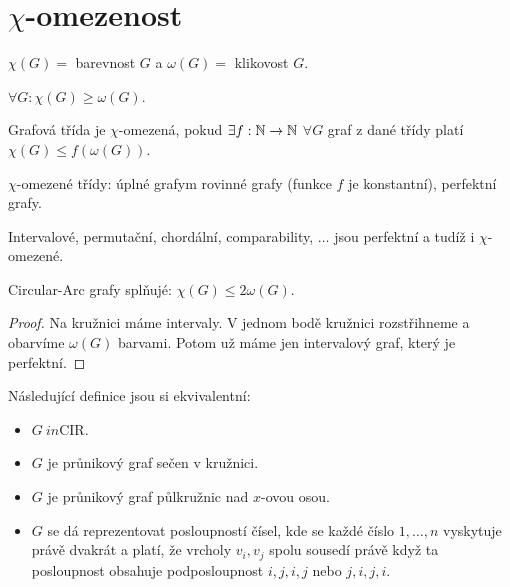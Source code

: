 \chapter{$\chi$-omezenost}

\begin{notation}
	$\chi(G) = $ barevnost $G$ a $\omega(G) = $ klikovost $G$.
\end{notation}

\begin{observ}
	$\forall G: \chi(G) \geq \omega(G)$.
\end{observ}

\begin{defn}
	Grafová třída je $\chi$-omezená, pokud $\exists f : \mathbb{N} \to \mathbb{N}$ $\forall G$ graf z dané třídy platí $\chi(G) \leq f(\omega(G))$.
\end{defn}

\begin{example}
	$\chi$-omezené třídy: úplné grafym rovinné grafy (funkce $f$ je konstantní), perfektní grafy.
\end{example}

\begin{observ}
	Intervalové, permutační, chordální, comparability, $\dots$ jsou perfektní a tudíž i $\chi$-omezené.
\end{observ}

\begin{observ}
	Circular-Arc grafy splňujé: $\chi(G) \leq 2 \omega(G)$.
\end{observ}

\begin{proof}
	Na kružnici máme intervaly. V jednom bodě kružnici rozstřihneme a obarvíme $\omega(G)$ barvami. Potom už máme jen intervalový graf, který je perfektní.
\end{proof}

\begin{defn}
	Následující definice jsou si ekvivalentní:
	
	\begin{itemize}
		\item $G \ in \text{CIR}$.
		\item $G$ je průnikový graf sečen v kružnici.
		\item $G$ je průnikový graf půlkružnic nad $x$-ovou osou.
		\item $G$ se dá reprezentovat posloupností čísel, kde se každé číslo $1, \dots, n$ vyskytuje právě dvakrát a platí, že vrcholy $v_i, v_j$ spolu sousedí právě když ta posloupnost obsahuje podposloupnost $i,j,i,j$ nebo $j,i,j,i$.
	\end{itemize}
\end{defn}

